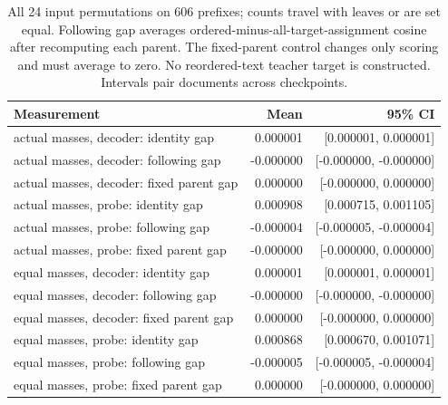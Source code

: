 \begin{table}[H]
\centering\small
\begin{tabularx}{\linewidth}{Yrr}
\toprule
Measurement & Mean & 95\% CI \\
\midrule
actual masses, decoder: identity gap & 0.000001 & [0.000001, 0.000001] \\
actual masses, decoder: following gap & -0.000000 & [-0.000000, -0.000000] \\
actual masses, decoder: fixed parent gap & 0.000000 & [-0.000000, 0.000000] \\
actual masses, probe: identity gap & 0.000908 & [0.000715, 0.001105] \\
actual masses, probe: following gap & -0.000004 & [-0.000005, -0.000004] \\
actual masses, probe: fixed parent gap & -0.000000 & [-0.000000, 0.000000] \\
equal masses, decoder: identity gap & 0.000001 & [0.000001, 0.000001] \\
equal masses, decoder: following gap & -0.000000 & [-0.000000, -0.000000] \\
equal masses, decoder: fixed parent gap & 0.000000 & [-0.000000, 0.000000] \\
equal masses, probe: identity gap & 0.000868 & [0.000670, 0.001071] \\
equal masses, probe: following gap & -0.000005 & [-0.000005, -0.000004] \\
equal masses, probe: fixed parent gap & 0.000000 & [-0.000000, 0.000000] \\
\bottomrule
\end{tabularx}
\caption{All 24 input permutations on 606 prefixes; counts travel with leaves or are set equal. Following gap averages ordered-minus-all-target-assignment cosine after recomputing each parent. The fixed-parent control changes only scoring and must average to zero. No reordered-text teacher target is constructed. Intervals pair documents across checkpoints.}
\label{tab:input-order}
\end{table}
